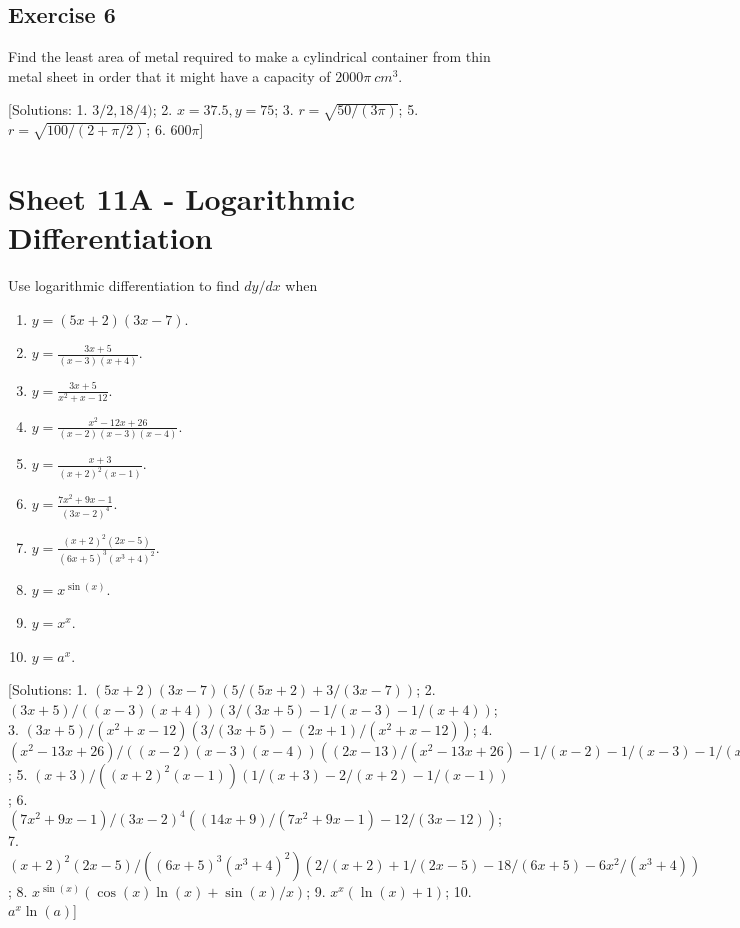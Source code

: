 \documentclass[
  11pt,
  oneside]{book}
\providecommand{\tightlist}{%
  \setlength{\itemsep}{0pt}\setlength{\parskip}{0pt}}
\newcommand{\slide}{}
\theoremstyle{definition}
\theoremstyle{definition}
\theoremstyle{definition}
\theoremstyle{definition}
\theoremstyle{remark}
\begin{document}
\subsection*{Exercise 6}\label{exercise-6-2}

Find the least area of metal required to make a cylindrical container from thin metal sheet in order that it might have a capacity of \(2000\pi\ cm^3\).

{[}Solutions: 1. \(3/2,18/4)\); 2. \(x=37.5, y = 75\); 3. \(r=\sqrt{50/(3\pi)}\); 5. \(r=\sqrt{100/(2+\pi/2)}\); 6. \(600\pi\){]}
\slide

\section{Sheet 11A - Logarithmic Differentiation}\label{sheet-11a---logarithmic-differentiation}

Use logarithmic differentiation to find \(dy/dx\) when

\begin{enumerate}
\def\labelenumi{\arabic{enumi}.}
\tightlist
\item
  \(y = (5x+2)(3x-7)\).
\item
  \(y = \frac{3x+5}{(x-3)(x+4)}\).
\item
  \(y = \frac{3x+5}{x^2+x-12}\).
\item
  \(y = \frac{x^2-12x+26}{(x-2)(x-3)(x-4)}\).
\item
  \(y = \frac{x+3}{(x+2)^2(x-1)}\).
\item
  \(y = \frac{7x^2+9x-1}{(3x-2)^4}\).
\item
  \(y = \frac{(x+2)^2(2x-5)}{(6x+5)^3(x^3+4)^2}\).
\item
  \(y = x^{\sin(x)}\).
\item
  \(y = x^x\).
\item
  \(y = a^x\).
\end{enumerate}

{[}Solutions: 1. \((5x+2)(3x-7)\left(5/(5x+2)+3/(3x-7)\right)\); 2. \((3x+5)/((x-3)(x+4))\left(3/(3x+5)-1/(x-3)-1/(x+4)\right)\); 3. \((3x+5)/(x^2+x-12)\left(3/(3x+5)-(2x+1)/(x^2+x-12)\right)\); 4. \((x^2-13x+26)/((x-2)(x-3)(x-4))\left((2x-13)/(x^2-13x+26)-1/(x-2)-1/(x-3)-1/(x-4)\right)\); 5. \((x+3)/((x+2)^2(x-1))\left(1/(x+3)-2/(x+2)-1/(x-1)\right)\); 6. \((7x^2+9x-1)/(3x-2)^4\left((14x+9)/(7x^2+9x-1)-12/(3x-12)\right)\); 7. \((x+2)^2(2x-5)/((6x+5)^3(x^3+4)^2)\left(2/(x+2)+1/(2x-5)-18/(6x+5)-6x^2/(x^3+4)\right)\); 8. \(x^{\sin(x)}\left(\cos(x)\ln(x)+\sin(x)/x\right)\); 9. \(x^x(\ln(x)+1)\); 10. \(a^x\ln(a)\){]}
\end{document}
